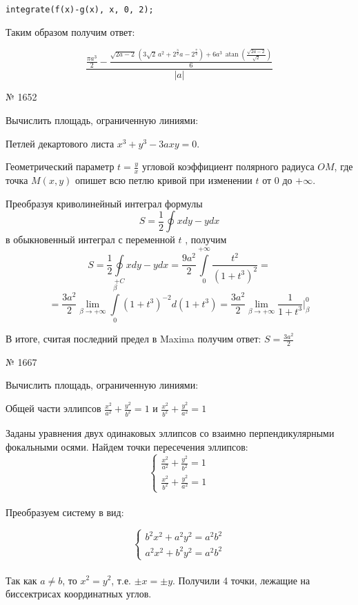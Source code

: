 \documentclass[article, bachelor, och, pract]{SCWorks}
\begin{document}
\begin{itemize}
\texttt{integrate(f(x)-g(x), x, 0, 2);}

Таким образом получим ответ:

\[\frac{\frac{\ensuremath{\pi} {{a}^{3}}}{2}-\frac{\sqrt{2a-2}\,\left( 3\sqrt{2}\,{{a}^{2}}+{{2}^{\frac{3}{2}}}a-{{2}^{\frac{7}{2}}}\right) +6{{a}^{3}}\,\operatorname{atan}\left( \frac{\sqrt{2a-2}}{\sqrt{2}}\right) }{6}}{\left| a\right| }\]

№ 1652

Вычислить площадь, ограниченную линиями:

Петлей декартового листа $x^3+y^3-3axy=0$. 

Геометрический параметр $t=\frac{y}{x}$ угловой коэффициент полярного радиуса $OM$, где точка $M(x, y)$ опишет всю петлю кривой при изменении $t$ от $0$ до $+\infty$.

Преобразуя криволинейный интеграл формулы $$S=\frac{1}{2}\oint xdy-ydx$$ в обыкновенный интеграл с переменной $t$ , получим $$S=\frac{1}{2}\oint\limits_{+C} xdy-ydx = \frac{9a^2}{2}\int\limits_{0}^{+\infty}\frac{t^2}{(1+t^3)^2}=$$
$$
=\frac{3a^2}{2}\lim\limits_{\beta \to +\infty}\int\limits_{0}^{\beta}(1+t^3)^{-2}d(1+t^3)=\frac{3a^2}{2}\lim\limits_{\beta \to +\infty}\frac{1}{1+t^3}|_{\beta}^{0}$$

В итоге, считая последний предел в Maxima получим ответ: $S=\frac{3a^2}{2}$

№ 1667

Вычислить площадь, ограниченную линиями:

Общей части эллипсов $\frac{x^2}{a^2}+\frac{y^2}{b^2}=1$ и $\frac{x^2}{b^2}+\frac{y^2}{a^2}=1$

Заданы уравнения двух одинаковых эллипсов со взаимно перпендикулярными фокальными осями. Найдем точки пересечения эллипсов:
$$
\left\{
\begin{array}{l}
\frac{x^2}{a^2}+\frac{y^2}{b^2}=1 \\
\frac{x^2}{b^2}+\frac{y^2}{a^2}=1
\end{array} \right. 
$$\\

Преобразуем систему в вид:

$$
\left\{
\begin{array}{l}
b^2x^2+a^2y^2=a^2b^2 \\
a^2x^2+b^2y^2=a^2b^2
\end{array} \right. 
$$\\

Так как $a\ne b$, то $x^2=y^2$, т.е. $\pm x= \pm y$. Получили 4 точки, лежащие на биссектрисах координатных углов. 


\end{itemize}
\end{document}
